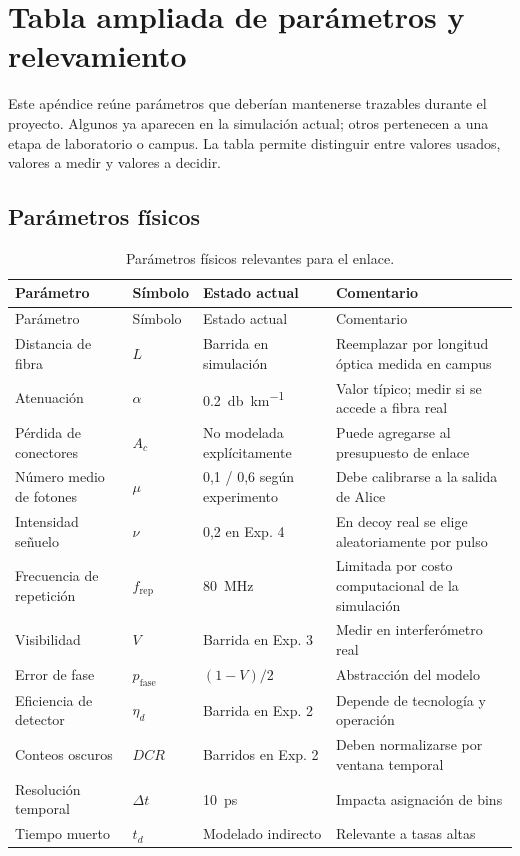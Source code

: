\chapter{Tabla ampliada de parámetros y relevamiento}
\label{app:parametros}

Este apéndice reúne parámetros que deberían mantenerse trazables durante el proyecto. Algunos ya aparecen en la simulación actual; otros pertenecen a una etapa de laboratorio o campus. La tabla permite distinguir entre valores usados, valores a medir y valores a decidir.

\section{Parámetros físicos}

\begin{longtable}{p{}p{}p{}p{}}
  \caption{Parámetros físicos relevantes para el enlace.}
  \label{tab:parametros_fisicos_ampliados}\\
  \toprule
  Parámetro & Símbolo & Estado actual & Comentario \\
  \midrule
  \endfirsthead
  \toprule
  Parámetro & Símbolo & Estado actual & Comentario \\
  \midrule
  \endhead
  Distancia de fibra & \(L\) & Barrida en simulación & Reemplazar por longitud óptica medida en campus \\
  Atenuación & \(\alpha\) & \SI{0.2}{\decibel\per\kilo\meter} & Valor típico; medir si se accede a fibra real \\
  Pérdida de conectores & \(A_c\) & No modelada explícitamente & Puede agregarse al presupuesto de enlace \\
  Número medio de fotones & \(\mu\) & 0,1 / 0,6 según experimento & Debe calibrarse a la salida de Alice \\
  Intensidad señuelo & \(\nu\) & 0,2 en Exp. 4 & En decoy real se elige aleatoriamente por pulso \\
  Frecuencia de repetición & \(f_\text{rep}\) & \SI{80}{\mega\hertz} & Limitada por costo computacional de la simulación \\
  Visibilidad & \(V\) & Barrida en Exp. 3 & Medir en interferómetro real \\
  Error de fase & \(p_\text{fase}\) & \((1-V)/2\) & Abstracción del modelo \\
  Eficiencia de detector & \(\eta_d\) & Barrida en Exp. 2 & Depende de tecnología y operación \\
  Conteos oscuros & \(DCR\) & Barridos en Exp. 2 & Deben normalizarse por ventana temporal \\
  Resolución temporal & \(\Delta t\) & \SI{10}{\pico\second} & Impacta asignación de bins \\
  Tiempo muerto & \(t_d\) & Modelado indirecto & Relevante a tasas altas \\
  \bottomrule
\end{longtable}

